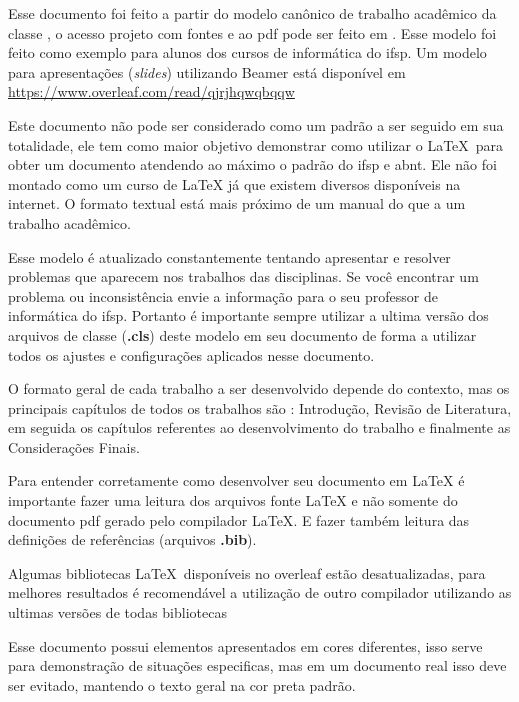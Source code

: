 

Esse documento foi feito a partir do modelo canônico de trabalho acadêmico da classe \abnTeX, o acesso projeto com fontes e ao \acs{pdf} pode ser feito em 
\urlmodelo. Esse modelo foi feito como exemplo para alunos dos cursos de informática do \ac{ifsp}. Um modelo para apresentações (\textit{slides}) utilizando Beamer está disponível em  \url{https://www.overleaf.com/read/qjrjhqwqbqqw}


Este documento não pode ser considerado como um padrão a ser seguido em sua totalidade, ele tem como maior objetivo demonstrar como utilizar o \LaTeX\ para obter um documento atendendo ao máximo o padrão do \ac{ifsp} e \ac{abnt}. Ele não foi montado como um curso de {\LaTeX} já que existem diversos disponíveis na internet. O formato textual está mais próximo de um manual do que a um trabalho acadêmico.

Esse modelo é atualizado constantemente tentando apresentar e resolver problemas que aparecem nos trabalhos das disciplinas. Se você encontrar um problema ou inconsistência envie a informação para o seu professor de informática do \ac{ifsp}. Portanto é importante sempre utilizar a ultima versão dos arquivos de classe (\textbf{.cls}) deste modelo em seu documento de forma a utilizar todos os ajustes e configurações aplicados nesse documento.

O formato geral de cada trabalho a ser desenvolvido depende do contexto, mas os principais capítulos de todos os trabalhos são : Introdução, Revisão de Literatura, em seguida os capítulos referentes ao desenvolvimento do trabalho e finalmente as Considerações Finais.

Para entender corretamente como desenvolver seu documento em {\LaTeX} é importante fazer uma leitura dos arquivos fonte {\LaTeX} e não somente do documento \acs{pdf} gerado pelo compilador {\LaTeX}. E fazer também leitura das definições de referências (arquivos \textbf{.bib}).

Algumas bibliotecas \LaTeX\ disponíveis no overleaf estão desatualizadas, para melhores resultados é recomendável a utilização de outro compilador utilizando as ultimas versões de todas bibliotecas

Esse documento possui elementos apresentados em cores diferentes, isso serve para demonstração de situações especificas, mas em um documento real isso deve ser evitado, mantendo o texto geral na cor preta padrão.

